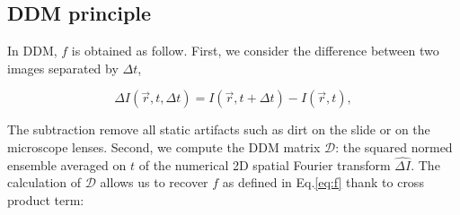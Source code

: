\documentclass[prb,twocolumn,amsmath,amssymb]{revtex4-1}
\newcommand{\tgn}[1]{{\color{blue}#1}} %
\begin{document}
{%


\subsection{DDM principle}

In DDM, $f$ is obtained as follow. First, we consider the difference between two images separated by $\Delta t$,

\begin{equation}
\Delta I(\vec{r},t, \Delta t) = I(\vec{r}, t+\Delta t) - I(\vec{r}, t),
\label{eq:DI}
\end{equation}

The subtraction remove all static artifacts such as dirt on the slide or on the microscope lenses. Second, we compute the DDM matrix $\mathcal{D}$: the squared normed  ensemble averaged on $t$ of the numerical 2D spatial Fourier transform $\widehat{\Delta I}$. The calculation of $\mathcal{D}$ allows us to recover $f$ as defined in Eq.\eqref{eq:f} thank to cross product term:

}
\end{document}
